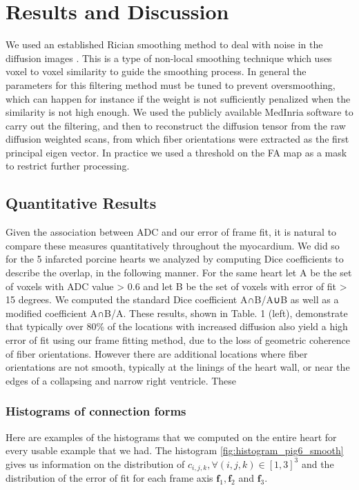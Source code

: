 \chapter{Results and Discussion}

We used an established Rician smoothing method to deal with noise in the diffusion images \cite{wiest2008rician}. This is a type of non-local smoothing technique which uses voxel to voxel similarity to guide the smoothing process. In general the parameters for this filtering method must be tuned to prevent oversmoothing, which can happen for instance if the weight is not sufficiently penalized when the similarity is not high enough. We used the publicly available MedInria software to carry out the filtering, and then to reconstruct the diffusion tensor from the raw diffusion weighted scans, from which fiber orientations were extracted as the first principal eigen vector. In practice we used a threshold on the FA map as a mask to restrict further processing.

\section{Quantitative Results}

Given the association between ADC and our error of frame fit, it is natural to compare these measures quantitatively throughout the myocardium. We did so for the 5 infarcted porcine hearts we analyzed by computing Dice coefficients to describe the overlap, in the following manner. For the same heart let A be the set of voxels with ADC value > 0.6 and let B be the set of voxels with error of fit > 15 degrees. We computed the standard Dice coefficient A∩B/A∪B as well as a modified coefficient A∩B/A. These results, shown in Table. 1 (left), demonstrate that typically over 80\% of the locations with increased diffusion also yield a high error of fit using our frame fitting method, due to the loss of geometric coherence of fiber orientations. However there are additional locations where fiber orientations are not smooth, typically at the linings of the heart wall, or near the edges of a collapsing and narrow right ventricle. These

\subsection{Histograms of connection forms} \label{histogram_section}

Here are examples of the histograms that we computed on the entire heart for every usable example that we had. The histogram \ref{fig:histogram_pig6_smooth} gives us information on the distribution of $c_{i,j,k}, \forall (i, j, k) \in [1, 3]^3$ and the distribution of the error of fit for each frame axis $\mathbf{f}_1, \mathbf{f}_2$ and $\mathbf{f}_3$.

